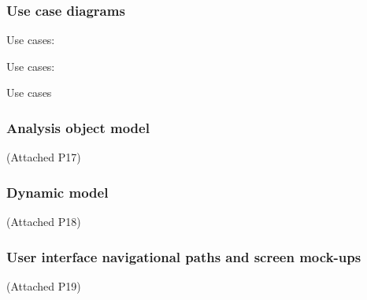 \documentclass[12pt]{article}
\begin{document}
{	\newpage	
\subsubsection{Use case diagrams}
\newpage
Use cases:

\newpage
Use cases:

\newpage
Use cases

		
\newpage
\subsubsection{Analysis object model}
(Attached P17)
\subsubsection{Dynamic model}
(Attached P18)
	
\subsubsection{User interface navigational paths and screen mock-ups} 
(Attached P19)
}
\end{document}
